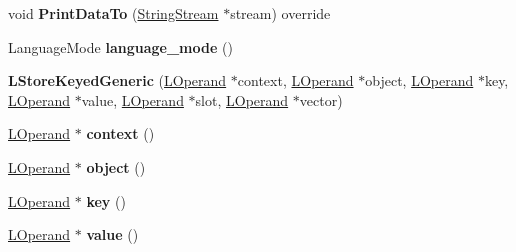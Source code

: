 \begin{DoxyCompactItemize}
\item 
void {\bfseries Print\+Data\+To} (\hyperlink{classv8_1_1internal_1_1_string_stream}{String\+Stream} $\ast$stream) override\hypertarget{classv8_1_1internal_1_1_l_store_keyed_generic_ab0d8e8441ce3f1b71da8ce0ccf807df8}{}\label{classv8_1_1internal_1_1_l_store_keyed_generic_ab0d8e8441ce3f1b71da8ce0ccf807df8}

\item 
Language\+Mode {\bfseries language\+\_\+mode} ()\hypertarget{classv8_1_1internal_1_1_l_store_keyed_generic_a279b2804fdca1b8181ce7a4b2e7a0d88}{}\label{classv8_1_1internal_1_1_l_store_keyed_generic_a279b2804fdca1b8181ce7a4b2e7a0d88}

\item 
{\bfseries L\+Store\+Keyed\+Generic} (\hyperlink{classv8_1_1internal_1_1_l_operand}{L\+Operand} $\ast$context, \hyperlink{classv8_1_1internal_1_1_l_operand}{L\+Operand} $\ast$object, \hyperlink{classv8_1_1internal_1_1_l_operand}{L\+Operand} $\ast$key, \hyperlink{classv8_1_1internal_1_1_l_operand}{L\+Operand} $\ast$value, \hyperlink{classv8_1_1internal_1_1_l_operand}{L\+Operand} $\ast$slot, \hyperlink{classv8_1_1internal_1_1_l_operand}{L\+Operand} $\ast$vector)\hypertarget{classv8_1_1internal_1_1_l_store_keyed_generic_af091880976ae47ab5668f689b739343e}{}\label{classv8_1_1internal_1_1_l_store_keyed_generic_af091880976ae47ab5668f689b739343e}

\item 
\hyperlink{classv8_1_1internal_1_1_l_operand}{L\+Operand} $\ast$ {\bfseries context} ()\hypertarget{classv8_1_1internal_1_1_l_store_keyed_generic_a4f167d2748fbfa19937cabab260ea080}{}\label{classv8_1_1internal_1_1_l_store_keyed_generic_a4f167d2748fbfa19937cabab260ea080}

\item 
\hyperlink{classv8_1_1internal_1_1_l_operand}{L\+Operand} $\ast$ {\bfseries object} ()\hypertarget{classv8_1_1internal_1_1_l_store_keyed_generic_af1106ab73c930b73c937d138a3b68d6e}{}\label{classv8_1_1internal_1_1_l_store_keyed_generic_af1106ab73c930b73c937d138a3b68d6e}

\item 
\hyperlink{classv8_1_1internal_1_1_l_operand}{L\+Operand} $\ast$ {\bfseries key} ()\hypertarget{classv8_1_1internal_1_1_l_store_keyed_generic_a8e5ab828ddbab917cc744e7c6022259d}{}\label{classv8_1_1internal_1_1_l_store_keyed_generic_a8e5ab828ddbab917cc744e7c6022259d}

\item 
\hyperlink{classv8_1_1internal_1_1_l_operand}{L\+Operand} $\ast$ {\bfseries value} ()\hypertarget{classv8_1_1internal_1_1_l_store_keyed_generic_ae0648fd1acbfca9be9ecd39a179ebb13}{}\label{classv8_1_1internal_1_1_l_store_keyed_generic_ae0648fd1acbfca9be9ecd39a179ebb13}


\end{DoxyCompactItemize}
